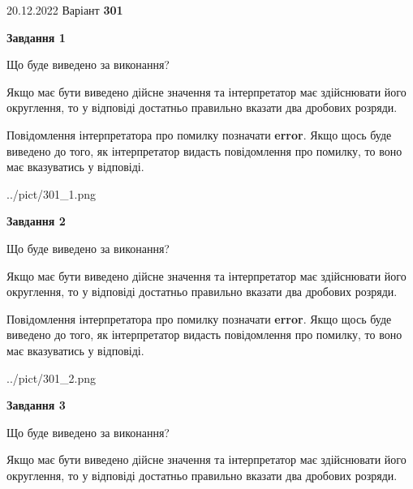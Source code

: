 \documentclass[12pt, ukrainian]{article}
\begin{document}
{20.12.2022 Варіант \No \textbf { 301 }\par}
{
\begin {Large}

{\begin {center}\textbf{Завдання 1}\end {center}}\par
Що буде виведено за виконання? \par

Якщо має бути виведено дійсне значення та інтерпретатор має здійснювати його округлення, 
то у відповіді достатньо правильно вказати два дробових розряди.

Повідомлення інтерпретатора про помилку позначати \textbf{error}.
Якщо щось буде виведено до того, як інтерпретатор видасть повідомлення про помилку, 
то воно має вказуватись у відповіді. \par

\begin{center}
	{../pict/301_1.png}
\end{center}
\newpage

{\begin {center}\textbf{Завдання 2}\end {center}}\par
Що буде виведено за виконання? \par

Якщо має бути виведено дійсне значення та інтерпретатор має здійснювати його округлення, 
то у відповіді достатньо правильно вказати два дробових розряди.

Повідомлення інтерпретатора про помилку позначати \textbf{error}.
Якщо щось буде виведено до того, як інтерпретатор видасть повідомлення про помилку, 
то воно має вказуватись у відповіді. \par

\begin{center}
	{../pict/301_2.png}
\end{center}
\newpage

{\begin {center}\textbf{Завдання 3}\end {center}}\par
Що буде виведено за виконання? \par

Якщо має бути виведено дійсне значення та інтерпретатор має здійснювати його округлення, 
то у відповіді достатньо правильно вказати два дробових розряди.


\end{Large}}
\end{document}
